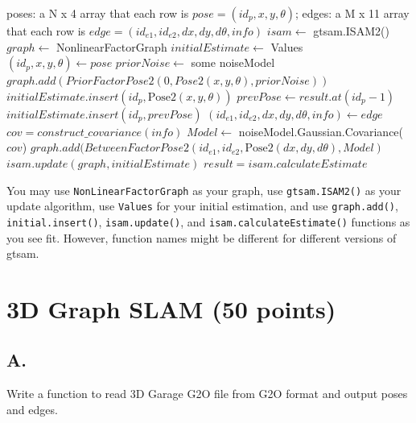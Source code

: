 \documentclass[tp]{lcc}
\begin{document}
\begin{algorithmic}[1]
\Require poses: a N x 4 array that each row is $pose=(id_{p},x,y,\theta)$; edges: a M x 11 array that each row is $edge=(id_{e1},id_{e2},dx,dy,d\theta,info)$
\State $isam \leftarrow$ gtsam.ISAM2() 
    \State $graph \leftarrow$ NonlinearFactorGraph 
    \State $initialEstimate \leftarrow$ Values 
    \State $(id_{p},x,y,\theta) \gets pose$ 
        \State $priorNoise \leftarrow$ some noiseModel 
        \State $graph.add(PriorFactorPose2(0,Pose2(x,y,\theta),priorNoise))$
        \State $initialEstimate.insert(id_{p},\text{Pose2}(x,y,\theta))$
    \Else {}
        \State $prevPose \gets result.at(id_{p}-1)$ 
        \State $initialEstimate.insert(id_{p},prevPose)$
    \EndIf
        \State $(id_{e1},id_{e2},dx,dy,d\theta,info) \gets edge$ 
            \State $cov=construct\_covariance(info)$ 
            \State $Model \leftarrow$ noiseModel.Gaussian.Covariance($cov$)
            \State $graph.add(BetweenFactorPose2(id_{e1},id_{e2},\text{Pose2}(dx,dy,d\theta),Model)$
        \EndIf
    \EndFor
    \State $isam.update(graph,initialEstimate)$
    \State $result=isam.calculateEstimate$
\EndFor
\end{algorithmic}

You may use \lstinline[style=bash]{NonLinearFactorGraph} as your graph, use \lstinline[style=bash]{gtsam.ISAM2()} as your update algorithm, use \lstinline[style=bash]{Values} for your initial estimation, and use \lstinline[style=bash]{graph.add()}, \lstinline[style=bash]{initial.insert()}, \lstinline[style=bash]{isam.update()}, and \lstinline[style=bash]{isam.calculateEstimate()} functions as you see fit. However, function names might be different for different versions of gtsam.

\section{3D Graph SLAM (50 points)}
\subsection{A.}
Write a function to read 3D Garage G2O file from G2O format and output poses and edges.
\end{document}
